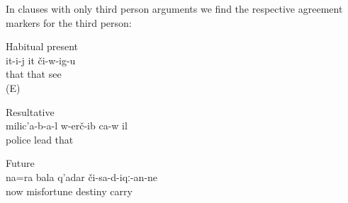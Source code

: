 In clauses with only third person arguments we find the respective agreement markers for the third person:
%
\begin{exe}
		\ex	Habitual present\\	\label{ex:S/he sees him habitual present}
		\gll	it-i-j	it	či-w-ig-u\\
			that	that	see\\
		\glt	{} (E)

		\ex	Resultative\\		\label{ex:The police took him resultative}
		\gll	milic'a-b-a-l	w-erč-ib	ca-w	il\\
			police	lead		that\\
		\glt	{}

		\ex	Future\\		\label{ex:Now he will also bring trouble future}
		\gll	na=ra	bala	q'adar	či-sa-d-iqː-an-ne\\
			now	misfortune	destiny	carry\\
		\glt	{}
\end{exe}


